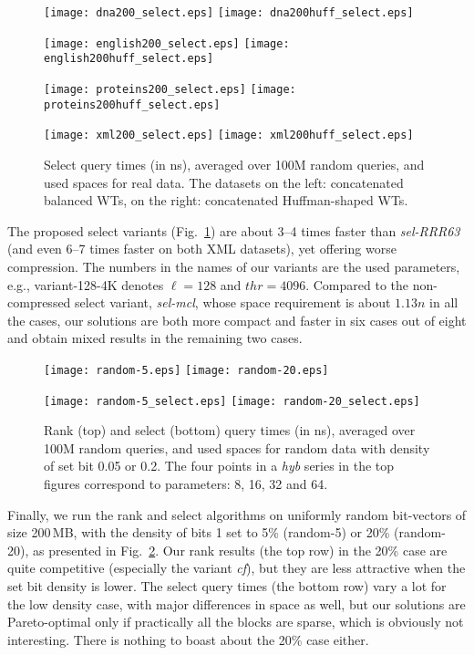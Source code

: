 \documentclass{llncs}
\begin{document}
\begin{figure}
\centerline{
\texttt{[image: dna200\_select.eps]}
\texttt{[image: dna200huff\_select.eps]}
}
\centerline{
\texttt{[image: english200\_select.eps]}
\texttt{[image: english200huff\_select.eps]}
}
\centerline{
\texttt{[image: proteins200\_select.eps]}
\texttt{[image: proteins200huff\_select.eps]}
}
\centerline{
\texttt{[image: xml200\_select.eps]}
\texttt{[image: xml200huff\_select.eps]}
}
\caption[Results]
{Select query times (in ns), averaged over 100M random queries, 
and used spaces for real data.
The datasets on the left: concatenated balanced WTs, 
on the right: concatenated Huffman-shaped WTs.}
\label{fig:cselects1}
\end{figure}


The proposed select variants (Fig.~\ref{fig:cselects1}) 
are about 3--4 times faster than {\em sel-RRR63} (and even 6--7 times faster 
on both XML datasets), yet offering worse compression. 
The numbers in the names of our variants are the used parameters, e.g.,
variant-128-4K denotes $\ell = 128$ and $thr = 4096$.
Compared to the non-compressed select variant, {\em sel-mcl}, 
whose space requirement is about $1.13n$ in all the cases, 
our solutions are both more compact and faster in six cases out of eight 
and obtain mixed results in the remaining two cases.


\begin{figure}
\centerline{
\texttt{[image: random-5.eps]}
\texttt{[image: random-20.eps]}
}
\centerline{
\texttt{[image: random-5\_select.eps]}
\texttt{[image: random-20\_select.eps]}
}
\caption[Results]
{Rank (top) and select (bottom) query times (in ns), 
averaged over 100M random queries, and used spaces for random data 
with density of set bit 0.05 or 0.2.
The four points in a {\em hyb} series in the top figures 
correspond to parameters: 8, 16, 32 and 64.
}
\label{fig:cranks_cselects_random}
\end{figure}


Finally, we run the rank and select algorithms on 
uniformly random bit-vectors of size 200\,MB, 
with the density of bits 1 set to 5\% (random-5) or 20\% (random-20), 
as presented in Fig.~\ref{fig:cranks_cselects_random}.
Our rank results (the top row) in the 20\% case are quite competitive 
(especially the variant {\em cf}), but they are less 
attractive when the set bit density is lower.
The select query times (the bottom row)
vary a lot for the low density case, with major differences in space as well, 
but our solutions are Pareto-optimal only if 
practically all the blocks are sparse, which is obviously not interesting.
There is nothing to boast about the 20\% case either.
\end{document}
